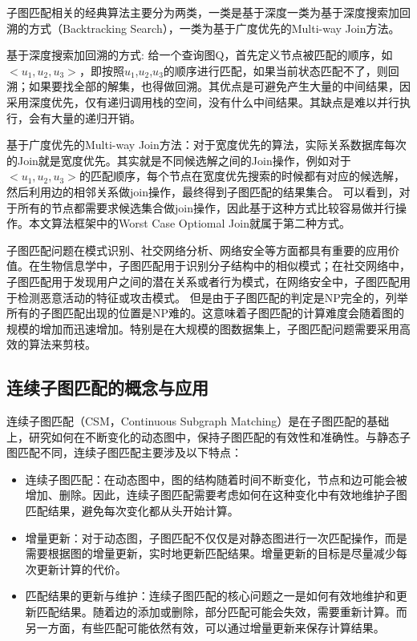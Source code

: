 子图匹配相关的经典算法主要分为两类，一类是基于深度一类为基于深度搜索加回溯的方式（Backtracking Search）\cite{sm-ullmann-DBLP:journals/jacm/Ullmann76}，一类为基于广度优先的Multi-way Join方法\cite{sm-bfs-DBLP:conf/focs/AtseriasGM08}。

基于深度搜索加回溯的方式: 给一个查询图Q，首先定义节点被匹配的顺序，如$<u_1,u_2,u_3>$，即按照$u_1$,$u_2$,$u_3$的顺序进行匹配，如果当前状态匹配不了，则回溯；如果要找全部的解集，也得做回溯。其优点是可避免产生大量的中间结果，因采用深度优先，仅有递归调用栈的空间，没有什么中间结果。其缺点是难以并行执行，会有大量的递归开销。

基于广度优先的Multi-way Join方法：对于宽度优先的算法，实际关系数据库每次的Join就是宽度优先。其实就是不同候选解之间的Join操作，例如对于$<u_1,u_2,u_3>$的匹配顺序，每个节点在宽度优先搜索的时候都有对应的候选解，然后利用边的相邻关系做join操作，最终得到子图匹配的结果集合。
可以看到，对于所有的节点都需要求候选集合做join操作，因此基于这种方式比较容易做并行操作。本文算法框架中的Worst Case Optiomal Join\cite{sm-bfs-DBLP:conf/focs/AtseriasGM08}就属于第二种方式。

子图匹配问题在模式识别、社交网络分析、网络安全等方面都具有重要的应用价值。在生物信息学中，子图匹配用于识别分子结构中的相似模式；在社交网络中，子图匹配用于发现用户之间的潜在关系或者行为模式，在网络安全中，子图匹配用于检测恶意活动的特征或攻击模式。
但是由于子图匹配的判定是NP完全的，列举所有的子图匹配出现的位置是NP难的。这意味着子图匹配的计算难度会随着图的规模的增加而迅速增加。特别是在大规模的图数据集上，子图匹配问题需要采用高效的算法来剪枝。

\subsection{连续子图匹配的概念与应用}
连续子图匹配（CSM，Continuous Subgraph Matching）是在子图匹配的基础上，研究如何在不断变化的动态图中，保持子图匹配的有效性和准确性。与静态子图匹配不同，连续子图匹配主要涉及以下特点：
\begin{itemize}
   \item 连续子图匹配：在动态图中，图的结构随着时间不断变化，节点和边可能会被增加、删除。因此，连续子图匹配需要考虑如何在这种变化中有效地维护子图匹配结果，避免每次变化都从头开始计算。
   \item 增量更新：对于动态图，子图匹配不仅仅是对静态图进行一次匹配操作，而是需要根据图的增量更新，实时地更新匹配结果。增量更新的目标是尽量减少每次更新计算的代价。
   \item 匹配结果的更新与维护：连续子图匹配的核心问题之一是如何有效地维护和更新匹配结果。随着边的添加或删除，部分匹配可能会失效，需要重新计算。而另一方面，有些匹配可能依然有效，可以通过增量更新来保存计算结果。
\end{itemize}

